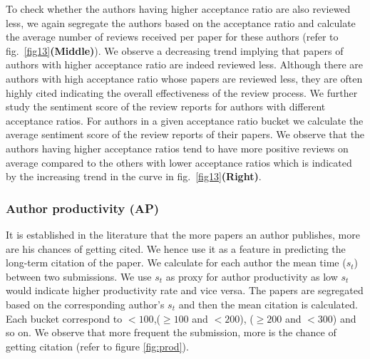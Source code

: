 To check whether the authors having higher acceptance ratio are also reviewed less, we again segregate the authors based on the acceptance ratio and calculate the average number of reviews received per paper for these authors (refer to fig.~\ref{fig13}{\bf (Middle)}). We observe a decreasing trend implying that papers of authors with higher acceptance ratio are indeed reviewed less. Although there are authors with high acceptance ratio whose papers are reviewed less, they are often highly cited indicating the overall effectiveness of the review process. We further study the sentiment score of the review reports for authors with different acceptance ratios. For authors in a given  acceptance ratio bucket we calculate the average sentiment score of the review reports of their papers.
We observe that the authors having higher acceptance ratios tend to have more positive reviews on average compared to the others with lower acceptance ratios which is indicated by the increasing trend in the curve in fig.~\ref{fig13}{\bf (Right)}. 

\subsubsection{Author productivity (AP)} It is established in the literature \cite{yan2012better} that the more papers an author publishes, more are his chances of getting cited. We hence use it as a feature in predicting the long-term citation of the paper. We calculate for each author the mean time ($s_t$) between two submissions. We use $s_t$ as proxy for author productivity as low $s_t$ would indicate higher productivity rate and vice versa.  
The papers are segregated based on the corresponding author's $s_t$ and then the mean citation is calculated. Each bucket correspond to $<100$,($\geq 100$ and $< 200$), ($\geq 200$ and $<300$) and so on. We observe that more frequent the submission, more is the chance of getting citation (refer to figure \ref{fig:prod}).


